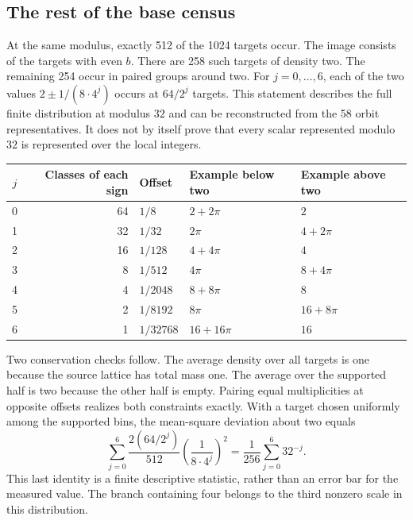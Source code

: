 \documentclass[12pt,letterpaper]{article}
\begin{document}
\subsection{The rest of the base census}
At the same modulus, exactly 512 of the 1024 targets occur. The image consists of the targets with even $b$. There are 258 such targets of density two. The remaining 254 occur in paired groups around two. For $j=0,\ldots,6$, each of the two values $2\pm1/(8\cdot4^j)$ occurs at $64/2^j$ targets. This statement describes the full finite distribution at modulus $32$ and can be reconstructed from the 58 orbit representatives. It does not by itself prove that every scalar represented modulo $32$ is represented over the local integers.
\begin{center}\small\begin{tabular}{crlll}\toprule
$j$&Classes of each sign&Offset&Example below two&Example above two\\\midrule
0&64&$1/8$&$2+2\pi$&$2$\\
1&32&$1/32$&$2\pi$&$4+2\pi$\\
2&16&$1/128$&$4+4\pi$&$4$\\
3&8&$1/512$&$4\pi$&$8+4\pi$\\
4&4&$1/2048$&$8+8\pi$&$8$\\
5&2&$1/8192$&$8\pi$&$16+8\pi$\\
6&1&$1/32768$&$16+16\pi$&$16$\\\bottomrule
\end{tabular}\end{center}
Two conservation checks follow. The average density over all targets is one because the source lattice has total mass one. The average over the supported half is two because the other half is empty. Pairing equal multiplicities at opposite offsets realizes both constraints exactly. With a target chosen uniformly among the supported bins, the mean-square deviation about two equals
\[
 \sum_{j=0}^{6} \frac{2(64/2^j)}{512}\left(\frac1{8\cdot4^j}\right)^2
       = \frac1{256}\sum_{j=0}^{6}32^{-j}.
\]
This last identity is a finite descriptive statistic, rather than an error bar for the measured value. The branch containing four belongs to the third nonzero scale in this distribution.
\end{document}
